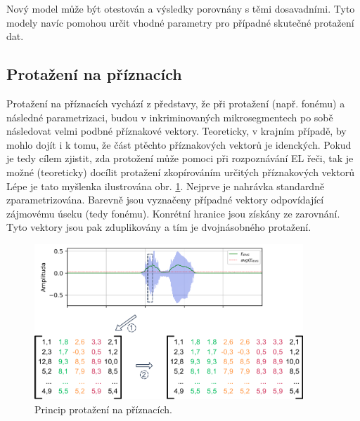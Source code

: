 \noindent Nový model může být otestován a výsledky porovnány s těmi dosavadními. Tyto modely navíc pomohou určit vhodné parametry pro případné skutečné protažení dat.


\subsection{Protažení na příznacích}
\label{chap:realisation:augmentation:features}

Protažení na příznacích vychází z představy, že při protažení (např. fonému) a následné parametrizaci, budou v inkriminovaných mikrosegmentech po sobě následovat velmi podbné příznakové vektory.
Teoreticky, v krajním případě, by mohlo dojít i k tomu, že část ptěchto příznakových vektorů je idenckých. Pokud je tedy cílem zjistit, zda protožení může pomoci při rozpoznávání EL řeči, tak je možné (teoreticky) docílit protažení zkopírováním určitých příznakových vektorů
Lépe je tato myšlenka ilustrována obr. \ref{fig:realisation:augmentation:features}. Nejprve je nahrávka standardně zparametrizována. Barevně jsou vyznačeny případné vektory odpovídající zájmovému úseku (tedy fonému). Konrétní hranice jsou získány ze zarovnání. Tyto vektory jsou pak zduplikovány a tím je  dvojnásobného protažení.

\begin{figure}[hbpt]
  \centering
  \includegraphics[width=0.9\textwidth]{./ch5-construction/img/augmentation_features.pdf}
  \caption{Princip protažení na příznacích.}
  \label{fig:realisation:augmentation:features}
\end{figure}

